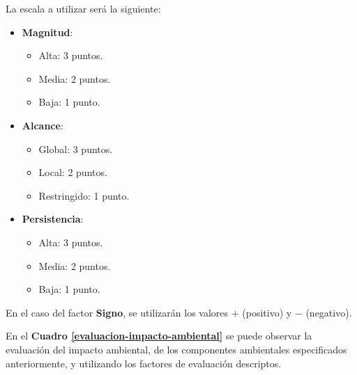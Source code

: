 La escala a utilizar será la siguiente:
\begin{itemize}
    \item \textbf{Magnitud}:
        \begin{itemize}
            \item Alta: 3 puntos.
            \item Media: 2 puntos.
            \item Baja: 1 punto.
        \end{itemize}
    
    \item \textbf{Alcance}:
        \begin{itemize}
            \item Global: 3 puntos.
            \item Local: 2 puntos.
            \item Restringido: 1 punto.
        \end{itemize}
    
    \item \textbf{Persistencia}:
        \begin{itemize}
            \item Alta: 3 puntos.
            \item Media: 2 puntos.
            \item Baja: 1 punto.
        \end{itemize}
\end{itemize}

En el caso del factor \textbf{Signo}, se utilizarán los valores \textit{$+$} (positivo) y \textit{$-$} (negativo).

En el \textbf{Cuadro \ref{evaluacion-impacto-ambiental}} se puede observar la evaluación del impacto ambiental, de los componentes ambientales especificados anteriormente, y utilizando los factores de evaluación descriptos.

